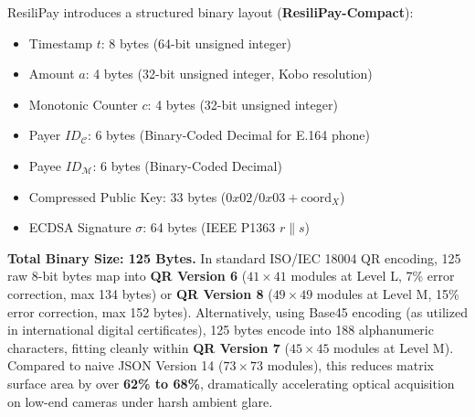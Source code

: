 \documentclass[conference]{IEEEtran}
\begin{document}
ResiliPay introduces a structured binary layout (\textbf{ResiliPay-Compact}):
\begin{itemize}
    \item Timestamp $t$: 8 bytes (64-bit unsigned integer)
    \item Amount $a$: 4 bytes (32-bit unsigned integer, Kobo resolution)
    \item Monotonic Counter $c$: 4 bytes (32-bit unsigned integer)
    \item Payer $ID_{\mathcal{C}}$: 6 bytes (Binary-Coded Decimal for E.164 phone)
    \item Payee $ID_{\mathcal{M}}$: 6 bytes (Binary-Coded Decimal)
    \item Compressed Public Key: 33 bytes ($0x02/0x03 + \text{coord}_X$)
    \item ECDSA Signature $\sigma$: 64 bytes (IEEE P1363 $r \parallel s$)
\end{itemize}
\textbf{Total Binary Size: 125 Bytes.} 
In standard ISO/IEC 18004 QR encoding, 125 raw 8-bit bytes map into \textbf{QR Version 6} ($41\times41$ modules at Level L, 7\% error correction, max 134 bytes) or \textbf{QR Version 8} ($49\times49$ modules at Level M, 15\% error correction, max 152 bytes). Alternatively, using Base45 encoding (as utilized in international digital certificates), 125 bytes encode into 188 alphanumeric characters, fitting cleanly within \textbf{QR Version 7} ($45\times45$ modules at Level M). Compared to naive JSON Version 14 ($73\times73$ modules), this reduces matrix surface area by over \textbf{62\% to 68\%}, dramatically accelerating optical acquisition on low-end cameras under harsh ambient glare.
\end{document}

